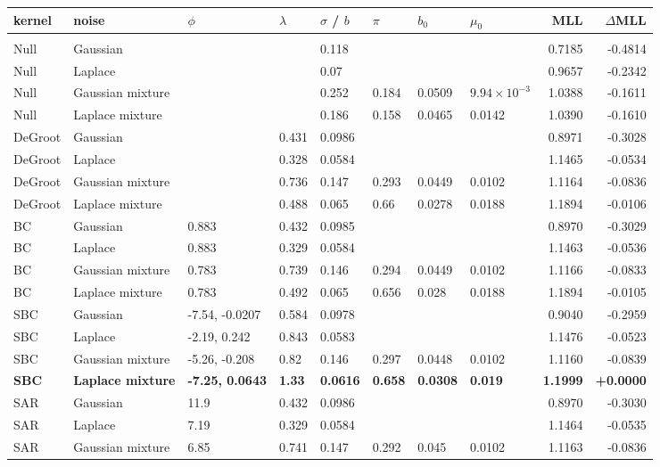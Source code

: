 \begin{longtable}{llllllllrr}
\toprule
kernel & noise & $\phi$ & $\lambda$ & $\sigma$ / $b$ & $\pi$ & $b_0$ & $\mu_0$ & MLL & $\Delta$MLL \\
\midrule
\endhead
\multicolumn{10}{l}{\vkg{}} \\
Null & Gaussian &  &  & 0.118 &  &  &  & 0.7185 & -0.4814 \\
Null & Laplace &  &  & 0.07 &  &  &  & 0.9657 & -0.2342 \\
Null & Gaussian mixture &  &  & 0.252 & 0.184 & 0.0509 & $9.94\times10^{-3}$ & 1.0388 & -0.1611 \\
Null & Laplace mixture &  &  & 0.186 & 0.158 & 0.0465 & 0.0142 & 1.0390 & -0.1610 \\
DeGroot & Gaussian &  & 0.431 & 0.0986 &  &  &  & 0.8971 & -0.3028 \\
DeGroot & Laplace &  & 0.328 & 0.0584 &  &  &  & 1.1465 & -0.0534 \\
DeGroot & Gaussian mixture &  & 0.736 & 0.147 & 0.293 & 0.0449 & 0.0102 & 1.1164 & -0.0836 \\
DeGroot & Laplace mixture &  & 0.488 & 0.065 & 0.66 & 0.0278 & 0.0188 & 1.1894 & -0.0106 \\
BC & Gaussian & 0.883 & 0.432 & 0.0985 &  &  &  & 0.8970 & -0.3029 \\
BC & Laplace & 0.883 & 0.329 & 0.0584 &  &  &  & 1.1463 & -0.0536 \\
BC & Gaussian mixture & 0.783 & 0.739 & 0.146 & 0.294 & 0.0449 & 0.0102 & 1.1166 & -0.0833 \\
BC & Laplace mixture & 0.783 & 0.492 & 0.065 & 0.656 & 0.028 & 0.0188 & 1.1894 & -0.0105 \\
SBC & Gaussian & -7.54, -0.0207 & 0.584 & 0.0978 &  &  &  & 0.9040 & -0.2959 \\
SBC & Laplace & -2.19, 0.242 & 0.843 & 0.0583 &  &  &  & 1.1476 & -0.0523 \\
SBC & Gaussian mixture & -5.26, -0.208 & 0.82 & 0.146 & 0.297 & 0.0448 & 0.0102 & 1.1160 & -0.0839 \\
\textbf{SBC} & \textbf{Laplace mixture} & \textbf{-7.25, 0.0643} & \textbf{1.33} & \textbf{0.0616} & \textbf{0.658} & \textbf{0.0308} & \textbf{0.019} & \textbf{1.1999} & \textbf{+0.0000} \\
SAR & Gaussian & 11.9 & 0.432 & 0.0986 &  &  &  & 0.8970 & -0.3030 \\
SAR & Laplace & 7.19 & 0.329 & 0.0584 &  &  &  & 1.1464 & -0.0535 \\
SAR & Gaussian mixture & 6.85 & 0.741 & 0.147 & 0.292 & 0.045 & 0.0102 & 1.1163 & -0.0836 \\

\end{longtable}
